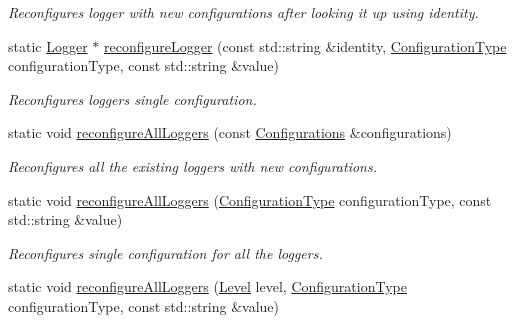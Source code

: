 \begin{DoxyCompactItemize}
\begin{DoxyCompactList}\small\item\em Reconfigures logger with new configurations after looking it up using identity. \end{DoxyCompactList}\item 
\hypertarget{a00049_aef49fdae329cefcc1c01428568dced4b}{}static \hyperlink{a00048}{Logger} $\ast$ \hyperlink{a00049_aef49fdae329cefcc1c01428568dced4b}{reconfigure\+Logger} (const std\+::string \&identity, \hyperlink{a00183_a281f5db6d6163678bc68a8b23b59e124}{Configuration\+Type} configuration\+Type, const std\+::string \&value)\label{a00049_aef49fdae329cefcc1c01428568dced4b}

\begin{DoxyCompactList}\small\item\em Reconfigures logger\textquotesingle{}s single configuration. \end{DoxyCompactList}\item 
\hypertarget{a00049_ac834df0f5e9e3dab18e70321a2543af7}{}static void \hyperlink{a00049_ac834df0f5e9e3dab18e70321a2543af7}{reconfigure\+All\+Loggers} (const \hyperlink{a00014}{Configurations} \&configurations)\label{a00049_ac834df0f5e9e3dab18e70321a2543af7}

\begin{DoxyCompactList}\small\item\em Reconfigures all the existing loggers with new configurations. \end{DoxyCompactList}\item 
\hypertarget{a00049_a1ebd33bc0208b430f41508e34509c7c9}{}static void \hyperlink{a00049_a1ebd33bc0208b430f41508e34509c7c9}{reconfigure\+All\+Loggers} (\hyperlink{a00183_a281f5db6d6163678bc68a8b23b59e124}{Configuration\+Type} configuration\+Type, const std\+::string \&value)\label{a00049_a1ebd33bc0208b430f41508e34509c7c9}

\begin{DoxyCompactList}\small\item\em Reconfigures single configuration for all the loggers. \end{DoxyCompactList}\item 
\hypertarget{a00049_ab24b99e5bb3c907d1418ee3266f15397}{}static void \hyperlink{a00049_ab24b99e5bb3c907d1418ee3266f15397}{reconfigure\+All\+Loggers} (\hyperlink{a00183_ab0ac6091262344c52dd2d3ad099e8e36}{Level} level, \hyperlink{a00183_a281f5db6d6163678bc68a8b23b59e124}{Configuration\+Type} configuration\+Type, const std\+::string \&value)\label{a00049_ab24b99e5bb3c907d1418ee3266f15397}


\end{DoxyCompactItemize}
